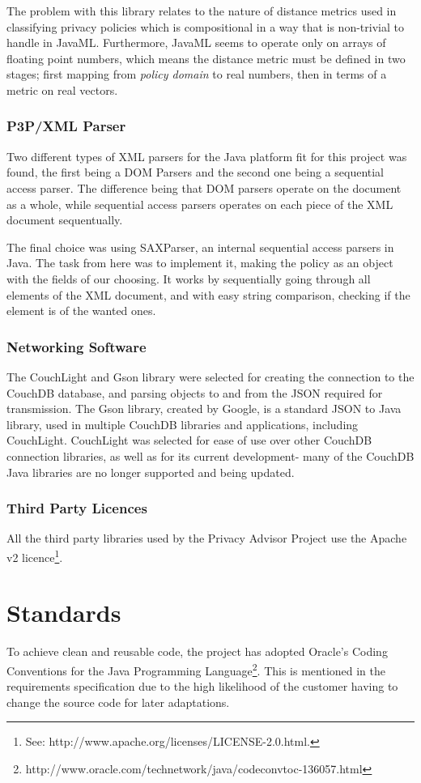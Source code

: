The problem with this library relates to the nature of distance metrics used in classifying privacy policies which is compositional in a way that is non-trivial to handle in JavaML. Furthermore, JavaML seems to operate only on arrays of floating point numbers, which means the distance metric must be defined in two stages; first mapping from \emph{policy domain} to real numbers, then in terms of a metric on real vectors.

\subsubsection{P3P/XML Parser}
Two different types of XML parsers for the Java platform fit for this project was found, the first being a DOM Parsers and the second one being a sequential access parser. The difference being that DOM parsers operate on the document as a whole, while sequential access parsers operates on each piece of the XML document sequentually.

The final choice was using SAXParser, an internal sequential access parsers in Java. The task from here was to implement it, making the policy as an object with the fields of our choosing. It works by sequentially going through all elements of the XML document, and with easy string comparison, checking if the element is of the wanted ones.

\subsubsection{Networking Software}
The CouchLight and Gson library were selected for creating the connection to the CouchDB database, and parsing objects to and from the JSON required for transmission. The Gson library, created by Google, is a standard JSON to Java library, used in multiple CouchDB libraries and applications, including CouchLight. CouchLight was selected for ease of use over other CouchDB connection libraries, as well as for its current development- many of the CouchDB Java libraries are no longer supported and being updated.

\subsubsection{Third Party Licences}
All the third party libraries used by the Privacy Advisor Project use the Apache v2 licence\footnote{See: http://www.apache.org/licenses/LICENSE-2.0.html.}.


\section{Standards}
To achieve clean and reusable code, the project has adopted Oracle's Coding Conventions for the Java Programming Language\footnote{http://www.oracle.com/technetwork/java/codeconvtoc-136057.html}. This is mentioned in the requirements specification due to the high likelihood of the customer having to change the source code for later adaptations.
